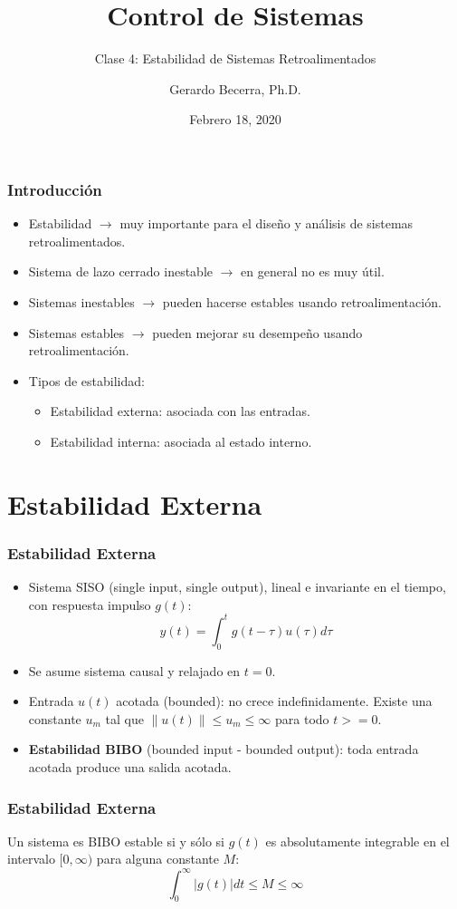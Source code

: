 \documentclass[aspectratio=169,handout]{beamer}
\title{Control de Sistemas}
\subtitle{\small Clase 4: Estabilidad de Sistemas Retroalimentados}
\author{Gerardo Becerra, Ph.D.}
\institute{Pontificia Universidad Javeriana\\ Departamento de Electrónica}
\date{Febrero 18, 2020}
\newcommand{\norm}[1]{\left\lVert#1\right\rVert}
\theoremstyle{definition}
\theoremstyle{plain}
\theoremstyle{remark}
\begin{document}
\frame{\titlepage}	


\begin{frame}[<+->]\frametitle{Introducción}
\begin{itemize}
	\item Estabilidad $\rightarrow$ muy importante para el diseño y análisis de sistemas retroalimentados.
	\item Sistema de lazo cerrado inestable $\rightarrow$ en general no es muy útil.
	\item Sistemas inestables $\rightarrow$ pueden hacerse estables usando retroalimentación.
	\item Sistemas estables $\rightarrow$ pueden mejorar su desempeño usando retroalimentación.
	\item Tipos de estabilidad:
	\begin{itemize}
		\item Estabilidad externa: asociada con las entradas.
		\item Estabilidad interna: asociada al estado interno.
	\end{itemize}
\end{itemize}
\end{frame}

\section{Estabilidad Externa}
\begin{frame}[<+->]\frametitle{Estabilidad Externa}
\begin{itemize}
 	\item Sistema SISO (single input, single output), lineal e invariante en el tiempo, con respuesta impulso $g(t)$:
	\begin{equation*}
		y(t) = \int_0^t g(t-\tau) u(\tau) d\tau
	\end{equation*}
	\item Se asume sistema causal y relajado en $t=0$.
	\item Entrada $u(t)$ acotada (bounded): no crece indefinidamente. Existe una constante $u_m$ tal que $\norm{u(t)} \leq u_m \leq \infty$ para todo $t >= 0$.
  \item \textbf{Estabilidad BIBO} (bounded input - bounded output): toda entrada acotada produce una salida acotada.
 \end{itemize} 
\end{frame}

\begin{frame}[<-+>]\frametitle{Estabilidad Externa}
  \begin{theorem}\label{th:externalStability1}
  Un sistema es BIBO estable si y sólo si $g(t)$ es absolutamente integrable en el intervalo $[0,\infty)$ para alguna constante $M$:
  \begin{equation*}
  	\int_0^\infty |g(t)| dt \leq M \leq \infty
  \end{equation*}
  \end{theorem}
\end{frame}
\end{document}
